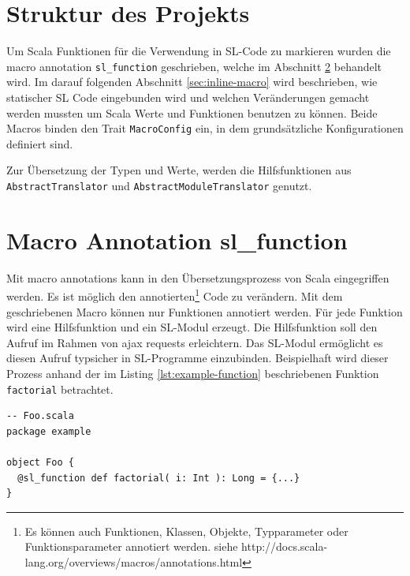 \documentclass[12pt]{scrreprt}
\begin{document}
\section{Struktur des Projekts}
\label{sec:project-structure}

Um Scala Funktionen für die Verwendung in \ac{SL}-Code zu markieren wurden die macro annotation \lstinline!sl_function! geschrieben, welche im Abschnitt \ref{sec:annotation-macro} behandelt wird. Im darauf folgenden Abschnitt \ref{sec:inline-macro} wird beschrieben, wie statischer \ac{SL} Code eingebunden wird und welchen Veränderungen gemacht werden mussten um Scala Werte und Funktionen benutzen zu können. Beide Macros binden den Trait \lstinline!MacroConfig! ein, in dem grundsätzliche Konfigurationen definiert sind. 


Zur Übersetzung der Typen und Werte, werden die Hilfsfunktionen aus \lstinline!AbstractTranslator! und \lstinline!AbstractModuleTranslator! genutzt.


\section{Macro Annotation sl\_function }
\label{sec:annotation-macro}

Mit macro annotations kann in den Übersetzungsprozess von Scala eingegriffen werden. Es ist möglich den annotierten\footnote{Es können auch Funktionen, Klassen, Objekte, Typparameter oder Funktionsparameter annotiert werden. siehe http://docs.scala-lang.org/overviews/macros/annotations.html} Code zu verändern. Mit dem geschriebenen Macro können nur Funktionen annotiert werden. Für jede Funktion wird eine Hilfsfunktion und ein \ac{SL}-Modul erzeugt. Die Hilfsfunktion soll den Aufruf im Rahmen von ajax requests erleichtern. Das \ac{SL}-Modul ermöglicht es diesen Aufruf typsicher in \ac{SL}-Programme einzubinden. Beispielhaft wird dieser Prozess anhand der im Listing \ref{lst:example-function} beschriebenen Funktion \lstinline!factorial! betrachtet.

\begin{lstlisting}[caption=Scala Beispielfunktion, label=lst:example-function, float=h]
-- Foo.scala
package example

object Foo {
  @sl_function def factorial( i: Int ): Long = {...}
}
\end{lstlisting}
\end{document}
